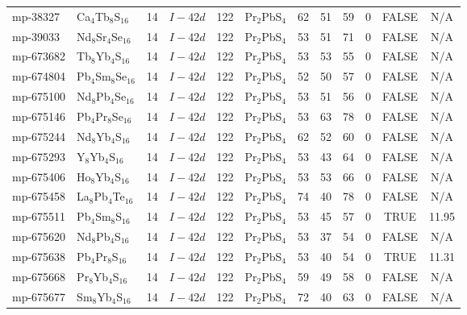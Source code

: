 {\begin{longtable}{llcccccccccc}
    mp-38327 & Ca$_{4}$Tb$_{8}$S$_{16}$ & 14    & $I-42d$ & 122   & Pr$_{2}$PbS$_{4}$ & 62    & 51    & 59    & 0     & FALSE & N/A \\
    mp-39033 & Nd$_{8}$Sr$_{4}$Se$_{16}$ & 14    & $I-42d$ & 122   & Pr$_{2}$PbS$_{4}$ & 53    & 51    & 71    & 0     & FALSE & N/A \\
    mp-673682 & Tb$_{8}$Yb$_{4}$S$_{16}$ & 14    & $I-42d$ & 122   & Pr$_{2}$PbS$_{4}$ & 53    & 53    & 55    & 0     & FALSE & N/A \\
    mp-674804 & Pb$_{4}$Sm$_{8}$Se$_{16}$ & 14    & $I-42d$ & 122   & Pr$_{2}$PbS$_{4}$ & 52    & 50    & 57    & 0     & FALSE & N/A \\
    mp-675100 & Nd$_{8}$Pb$_{4}$Se$_{16}$ & 14    & $I-42d$ & 122   & Pr$_{2}$PbS$_{4}$ & 53    & 51    & 56    & 0     & FALSE & N/A \\
    mp-675146 & Pb$_{4}$Pr$_{8}$Se$_{16}$ & 14    & $I-42d$ & 122   & Pr$_{2}$PbS$_{4}$ & 53    & 63    & 78    & 0     & FALSE & N/A \\
    mp-675244 & Nd$_{8}$Yb$_{4}$S$_{16}$ & 14    & $I-42d$ & 122   & Pr$_{2}$PbS$_{4}$ & 62    & 52    & 60    & 0     & FALSE & N/A \\
    mp-675293 & Y$_{8}$Yb$_{4}$S$_{16}$ & 14    & $I-42d$ & 122   & Pr$_{2}$PbS$_{4}$ & 53    & 43    & 64    & 0     & FALSE & N/A \\
    mp-675406 & Ho$_{8}$Yb$_{4}$S$_{16}$ & 14    & $I-42d$ & 122   & Pr$_{2}$PbS$_{4}$ & 53    & 53    & 66    & 0     & FALSE & N/A \\
    mp-675458 & La$_{8}$Pb$_{4}$Te$_{16}$ & 14    & $I-42d$ & 122   & Pr$_{2}$PbS$_{4}$ & 74    & 40    & 78    & 0     & FALSE & N/A \\
    mp-675511 & Pb$_{4}$Sm$_{8}$S$_{16}$ & 14    & $I-42d$ & 122   & Pr$_{2}$PbS$_{4}$ & 53    & 45    & 57    & 0     & TRUE  & 11.95  \\
    mp-675620 & Nd$_{8}$Pb$_{4}$S$_{16}$ & 14    & $I-42d$ & 122   & Pr$_{2}$PbS$_{4}$ & 53    & 37    & 54    & 0     & FALSE & N/A \\
    mp-675638 & Pb$_{4}$Pr$_{8}$S$_{16}$ & 14    & $I-42d$ & 122   & Pr$_{2}$PbS$_{4}$ & 53    & 40    & 54    & 0     & TRUE  & 11.31  \\
    mp-675668 & Pr$_{8}$Yb$_{4}$S$_{16}$ & 14    & $I-42d$ & 122   & Pr$_{2}$PbS$_{4}$ & 59    & 49    & 58    & 0     & FALSE & N/A \\
    mp-675677 & Sm$_{8}$Yb$_{4}$S$_{16}$ & 14    & $I-42d$ & 122   & Pr$_{2}$PbS$_{4}$ & 72    & 40    & 63    & 0     & FALSE & N/A \\

\end{longtable}}
